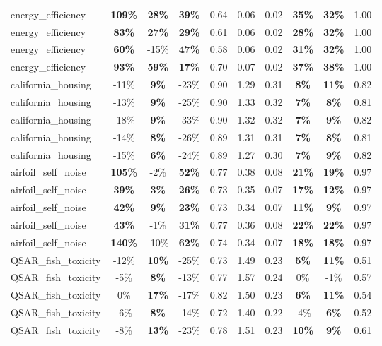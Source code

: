 \begin{table}[!htbp]
\begin{small}
\begin{sc}
{\begin{tabular}{lccccccccc}
energy\_efficiency & \textbf{109\%} & \textbf{28\%} & \textbf{39\%} & 0.64 & 0.06 & 0.02 & \textbf{35\%} & \textbf{32\%} & 1.00 \\
energy\_efficiency & \textbf{83\%} & \textbf{27\%} & \textbf{29\%} & 0.61 & 0.06 & 0.02 & \textbf{28\%} & \textbf{32\%} & 1.00 \\
energy\_efficiency & \textbf{60\%} & -15\% & \textbf{47\%} & 0.58 & 0.06 & 0.02 & \textbf{31\%} & \textbf{32\%} & 1.00 \\
energy\_efficiency & \textbf{93\%} & \textbf{59\%} & \textbf{17\%} & 0.70 & 0.07 & 0.02 & \textbf{37\%} & \textbf{38\%} & 1.00 \\
california\_housing & -11\% & \textbf{9\%} & -23\% & 0.90 & 1.29 & 0.31 & \textbf{8\%} & \textbf{11\%} & 0.82 \\
california\_housing & -13\% & \textbf{9\%} & -25\% & 0.90 & 1.33 & 0.32 & \textbf{7\%} & \textbf{8\%} & 0.81 \\
california\_housing & -18\% & \textbf{9\%} & -33\% & 0.90 & 1.32 & 0.32 & \textbf{7\%} & \textbf{9\%} & 0.82 \\
california\_housing & -14\% & \textbf{8\%} & -26\% & 0.89 & 1.31 & 0.31 & \textbf{7\%} & \textbf{8\%} & 0.81 \\
california\_housing & -15\% & \textbf{6\%} & -24\% & 0.89 & 1.27 & 0.30 & \textbf{7\%} & \textbf{9\%} & 0.82 \\
airfoil\_self\_noise & \textbf{105\%} & -2\% & \textbf{52\%} & 0.77 & 0.38 & 0.08 & \textbf{21\%} & \textbf{19\%} & 0.97 \\
airfoil\_self\_noise & \textbf{39\%} & \textbf{3\%} & \textbf{26\%} & 0.73 & 0.35 & 0.07 & \textbf{17\%} & \textbf{12\%} & 0.97 \\
airfoil\_self\_noise & \textbf{42\%} & \textbf{9\%} & \textbf{23\%} & 0.73 & 0.34 & 0.07 & \textbf{11\%} & \textbf{9\%} & 0.97 \\
airfoil\_self\_noise & \textbf{43\%} & -1\% & \textbf{31\%} & 0.77 & 0.36 & 0.08 & \textbf{22\%} & \textbf{22\%} & 0.97 \\
airfoil\_self\_noise & \textbf{140\%} & -10\% & \textbf{62\%} & 0.74 & 0.34 & 0.07 & \textbf{18\%} & \textbf{18\%} & 0.97 \\
QSAR\_fish\_toxicity & -12\% & \textbf{10\%} & -25\% & 0.73 & 1.49 & 0.23 & \textbf{5\%} & \textbf{11\%} & 0.51 \\
QSAR\_fish\_toxicity & -5\% & \textbf{8\%} & -13\% & 0.77 & 1.57 & 0.24 & 0\% & -1\% & 0.57 \\
QSAR\_fish\_toxicity & 0\% & \textbf{17\%} & -17\% & 0.82 & 1.50 & 0.23 & \textbf{6\%} & \textbf{11\%} & 0.54 \\
QSAR\_fish\_toxicity & -6\% & \textbf{8\%} & -14\% & 0.72 & 1.40 & 0.22 & -4\% & \textbf{6\%} & 0.52 \\
QSAR\_fish\_toxicity & -8\% & \textbf{13\%} & -23\% & 0.78 & 1.51 & 0.23 & \textbf{10\%} & \textbf{9\%} & 0.61 \\
\bottomrule
\end{tabular}
}
\end{sc}
\end{small}
\end{table}
